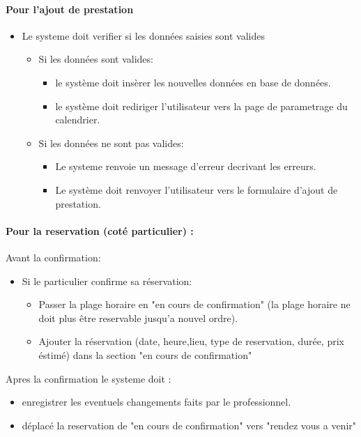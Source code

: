 \documentclass{article}
\begin{document}
\paragraph{Pour l'ajout de prestation}
\begin{itemize}
\item Le systeme doit verifier si les données saisies sont valides
	\begin{itemize}
	\item Si les données sont valides:
		\begin{itemize}
		\item le système doit insèrer les nouvelles données en base
                  de données.
                  \item le système doit rediriger l'utilisateur vers
                    la page de parametrage du calendrier.
		\end{itemize}
		\item Si les données ne sont pas valides:
		\begin{itemize}
		\item Le systeme renvoie un message d'erreur decrivant
                  les erreurs.
                \item Le système doit renvoyer l'utilisateur vers le
                  formulaire d'ajout de prestation.
		\end{itemize}
	\end{itemize}
\end{itemize}


\paragraph{Pour la reservation (coté particulier) :}
Avant la confirmation:
	\begin{itemize}
	\item Si le particulier confirme sa réservation:
		\begin{itemize}
		\item Passer la plage horaire en "en cours de confirmation"
			(la plage horaire ne doit plus être reservable jusqu'a nouvel ordre).
		\item Ajouter la réservation (date, heure,lieu, type de reservation, durée, prix éstimé) dans la section "en cours de confirmation"
		\end{itemize}
	\end{itemize}
Apres la confirmation le systeme doit :
		\begin{itemize}
		\item enregistrer les eventuels changements faits par le professionnel.
		\item déplacé la reservation de "en cours de confirmation" vers "rendez vous a venir"
		\end{itemize}
\end{document}
